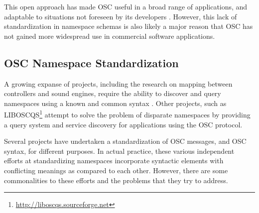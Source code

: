 \documentclass{NIME-alternate}
\begin{document}
%

This open approach has made OSC useful in a broad range of applications, and adaptable to situations not foreseen by its developers \cite{Wright:2005}.  However, this lack of standardization in namespace schemas is also likely a major reason that OSC has not gained more widespread use in commercial software applications.



\subsection{OSC Namespace Standardization} %
\label{sub:namespace_standardization}

A growing expanse of projects, including the research on mapping between controllers and sound engines, require the ability to discover and query namespaces using a known and common syntax \cite{Malloch:2007}. Other projects, such as LIBOSCQS\footnote{\url{http://liboscqs.sourceforge.net}} attempt to solve the problem of disparate namespaces by providing a query system and service discovery for applications using the OSC protocol\cite{Habets:2005}\cite{Schmeder:2004oscqs}.



Several projects have undertaken a standardization of OSC messages, and OSC syntax, for different purposes. In actual practice, these various independent efforts at standardizing namespaces incorporate syntactic elements with conflicting meanings as compared to each other. However, there are some commonalities to these efforts and the problems that they try to address.
\end{document}

